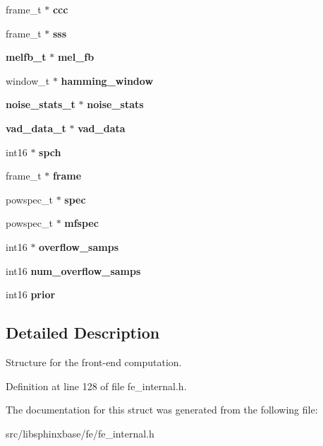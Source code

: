 \begin{DoxyCompactItemize}
\item 
frame\-\_\-t $\ast$ {\bfseries ccc}\label{structfe__s_afc472de43bd747de659dd57bc9a74fae}

\item 
frame\-\_\-t $\ast$ {\bfseries sss}\label{structfe__s_a6525c59397073d363e1844c28746fcb9}

\item 
{\bf melfb\-\_\-t} $\ast$ {\bfseries mel\-\_\-fb}\label{structfe__s_ae5a054dbac5e32cf028b6d6d4c9391bd}

\item 
window\-\_\-t $\ast$ {\bfseries hamming\-\_\-window}\label{structfe__s_ad47433337a370e452070ffddce87e474}

\item 
{\bf noise\-\_\-stats\-\_\-t} $\ast$ {\bfseries noise\-\_\-stats}\label{structfe__s_a6b1303b8c74a676ca9dcc9adc07033e9}

\item 
{\bf vad\-\_\-data\-\_\-t} $\ast$ {\bfseries vad\-\_\-data}\label{structfe__s_aaae66e5327a74c4270c8f0decd4d4389}

\item 
int16 $\ast$ {\bfseries spch}\label{structfe__s_a7d49693c1fa1b14bbcd25b87ad97935b}

\item 
frame\-\_\-t $\ast$ {\bfseries frame}\label{structfe__s_a6fe89784eb5d23ee812439f427d33fe6}

\item 
powspec\-\_\-t $\ast$ {\bfseries spec}\label{structfe__s_af455b0ee3f8d81ca84ac88d4ea04e860}

\item 
powspec\-\_\-t $\ast$ {\bfseries mfspec}\label{structfe__s_a87fd448109884fc3d796b926b67697e7}

\item 
int16 $\ast$ {\bfseries overflow\-\_\-samps}\label{structfe__s_a7975216c6a540fa498352736404797b1}

\item 
int16 {\bfseries num\-\_\-overflow\-\_\-samps}\label{structfe__s_ac22fe7c117ef00eb513d7d0771333ddd}

\item 
int16 {\bfseries prior}\label{structfe__s_ae6af635a19dac6426bf882a3fc5b069b}

\end{DoxyCompactItemize}


\subsection{Detailed Description}
Structure for the front-\/end computation. 



Definition at line 128 of file fe\-\_\-internal.\-h.



The documentation for this struct was generated from the following file\-:\begin{DoxyCompactItemize}
\item 
src/libsphinxbase/fe/fe\-\_\-internal.\-h\end{DoxyCompactItemize}
